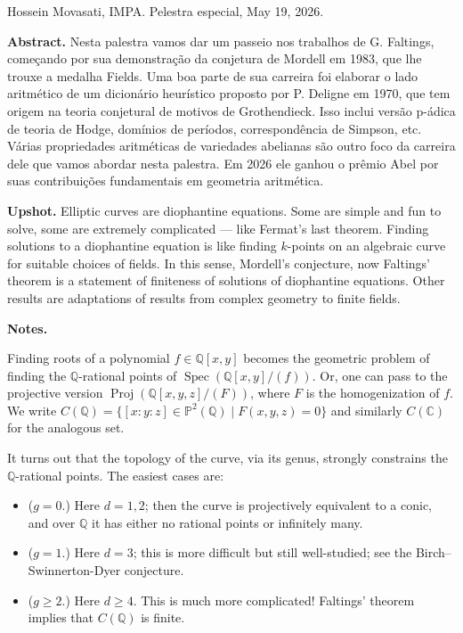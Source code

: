 \noindent
Hossein Movasati, IMPA.
Pelestra especial,
May 19, 2026.

\medskip\noindent
{\bf Abstract.}
Nesta palestra vamos dar um passeio nos
trabalhos de G. Faltings, começando por sua
demonstração da conjetura de Mordell em
1983, que lhe trouxe a medalha Fields. Uma
boa parte de sua carreira foi elaborar o
lado aritmético de um dicionário heurístico
proposto por P. Deligne em 1970, que tem
origem na teoria conjetural de motivos de
Grothendieck. Isso inclui versão p-ádica de
teoria de Hodge, domínios de períodos,
correspondência de Simpson, etc. Várias
propriedades aritméticas de variedades
abelianas são outro foco da carreira dele
que vamos abordar nesta palestra. Em 2026
ele ganhou o prêmio Abel por suas
contribuições fundamentais em geometria
aritmética.

\medskip\noindent
{\bf Upshot.} 
Elliptic curves are diophantine equations.
Some are simple and fun to solve,
some are extremely complicated ---
like Fermat's last theorem.
Finding solutions to a diophantine
equation is like finding $k$-points
on an algebraic curve for suitable
choices of fields.
In this sense,
Mordell's conjecture, now Faltings'
theorem is a statement of finiteness
of solutions of diophantine equations.
Other results are adaptations
of results from complex geometry
to finite fields.

\medskip\noindent
{\bf Notes.}

Finding roots of a polynomial $f \in
\mathbb{Q}[x,y]$ becomes the geometric
problem of finding the $\mathbb{Q}$-rational
points of $\operatorname{Spec}(\mathbb{Q}[x,y]/(f))$.
Or, one can pass to the projective version
$\operatorname{Proj}(\mathbb{Q}[x,y,z]/(F))$,
where $F$ is the homogenization of $f$.
We write
$C(\mathbb{Q})=\{[x:y:z] \in
\mathbb{P}^2(\mathbb{Q}) \mid
F(x,y,z)=0\}$
and similarly $C(\mathbb{C})$ for the
analogous set.
 
It turns out that the topology
of the curve, via its genus, strongly
constrains the $\mathbb{Q}$-rational points.
The easiest cases are:
\begin{itemize}
\item ($g=0$.) Here $d=1,2$;
then the curve is projectively equivalent to
a conic, and over $\mathbb{Q}$ it has either
no rational points or infinitely many.

\item ($g=1$.) Here $d=3$; this is more difficult
but still well-studied; see the
Birch--Swinnerton-Dyer conjecture. 

\item ($g\geq 2$.) Here $d\geq 4$.
This is much more complicated!
Faltings'
theorem implies that $C(\mathbb{Q})$ is
finite.
\end{itemize}

